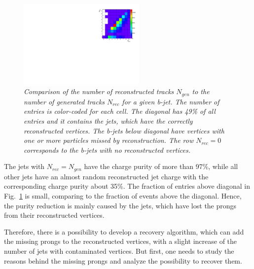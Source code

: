 \begin{figure}
{\centering
    \includegraphics[width=0.55\textwidth]{ILD/plots/rec-gen-table.pdf}
    \caption{\sl Comparison of the number of reconstructed tracks $N_{gen}$ to the number of generated tracks $N_{rec}$ for a given b-jet. The number of entries is color-coded for each cell. The diagonal has 49\% of all entries and it contains the jets, which have the correctly reconstructed vertices. The b-jets below diagonal have vertices with one or more particles missed by reconstruction. The row $N_{rec} = 0$ corresponds to the b-jets with no reconstructed vertices. %
    }
    \label{fig:Table_3}
  }
\end{figure}

The jets with $N_{rec}=N_{gen}$ have the charge purity of more than 97\%, while all other jets have an almost random reconstructed jet charge with the corresponding charge purity about 35\%.
The fraction of entries above diagonal in Fig.~\ref{fig:Table_3} is small, comparing to the fraction of events above the diagonal. 
Hence, the purity reduction is mainly caused by the jets, which have lost the prongs from their reconstructed vertices. 


Therefore, there is a possibility to develop a recovery algorithm, which can add the missing prongs to the reconstructed vertices, with a slight increase of the number of jets with contaminated vertices. 
But first, one needs to study the reasons behind the missing prongs and analyze the possibility to recover them. 

